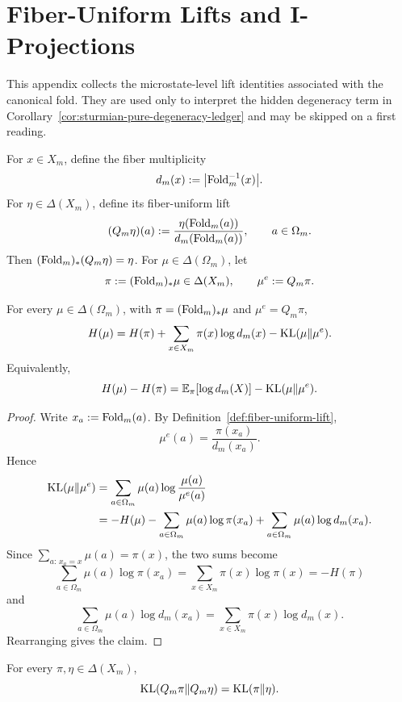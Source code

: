 \section{Fiber-Uniform Lifts and I-Projections}\label{app:fiber-lift}

This appendix collects the microstate-level lift identities associated with the
canonical fold. They are used only to interpret the hidden degeneracy term in
Corollary~\ref{cor:sturmian-pure-degeneracy-ledger} and may be skipped on a
first reading.

\begin{definition}\label{def:fiber-uniform-lift}
For \(x\in X_m\), define the fiber multiplicity
\[
d_m(x):=\bigl|\mathrm{Fold}_m^{-1}(x)\bigr|.
\]
For \(\eta\in\Delta(X_m)\), define its fiber-uniform lift
\[
(Q_m\eta)(a):=\frac{\eta(\mathrm{Fold}_m(a))}{d_m(\mathrm{Fold}_m(a))},
\qquad a\in\Omega_m.
\]
Then \((\mathrm{Fold}_m)_*(Q_m\eta)=\eta\). For \(\mu\in\Delta(\Omega_m)\), let
\[
\pi:=(\mathrm{Fold}_m)_*\mu\in\Delta(X_m),
\qquad
\mu^e:=Q_m\pi.
\]
\end{definition}

\begin{proposition}\label{prop:fold-entropy-ledger}
For every \(\mu\in\Delta(\Omega_m)\), with \(\pi=(\mathrm{Fold}_m)_*\mu\) and
\(\mu^e=Q_m\pi\),
\[
H(\mu)
=
H(\pi)+\sum_{x\in X_m}\pi(x)\log d_m(x)-\operatorname{KL}(\mu\|\mu^e).
\]
Equivalently,
\[
H(\mu)-H(\pi)
=
\mathbb{E}_{\pi}[\log d_m(X)]-\operatorname{KL}(\mu\|\mu^e).
\]
\end{proposition}

\begin{proof}
Write \(x_a:=\mathrm{Fold}_m(a)\). By Definition~\ref{def:fiber-uniform-lift},
\[
\mu^e(a)=\frac{\pi(x_a)}{d_m(x_a)}.
\]
Hence
\[
\begin{aligned}
\operatorname{KL}(\mu\|\mu^e)
&=
\sum_{a\in\Omega_m}\mu(a)\log\frac{\mu(a)}{\mu^e(a)}\\
&=
-H(\mu)-\sum_{a\in\Omega_m}\mu(a)\log\pi(x_a)
+\sum_{a\in\Omega_m}\mu(a)\log d_m(x_a).
\end{aligned}
\]
Since \(\sum_{a:\,x_a=x}\mu(a)=\pi(x)\), the two sums become
\[
\sum_{a\in\Omega_m}\mu(a)\log\pi(x_a)=\sum_{x\in X_m}\pi(x)\log\pi(x)=-H(\pi)
\]
and
\[
\sum_{a\in\Omega_m}\mu(a)\log d_m(x_a)
=
\sum_{x\in X_m}\pi(x)\log d_m(x).
\]
Rearranging gives the claim.
\end{proof}

\begin{proposition}\label{prop:fold-fiber-lift-kl-isometry}
For every \(\pi,\eta\in\Delta(X_m)\),
\[
\operatorname{KL}(Q_m\pi\|Q_m\eta)=\operatorname{KL}(\pi\|\eta).
\]
\end{proposition}

